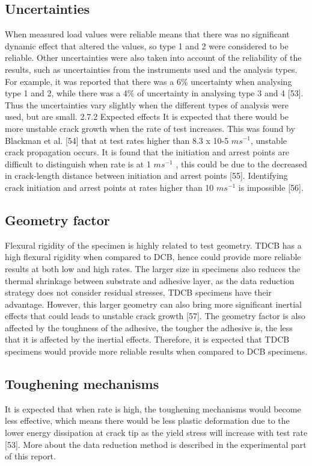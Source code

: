 \documentclass[numbers=noendperiod,chapterprefix=on]{icldt} %
\begin{document}
\subsection{Uncertainties}
When measured load values were reliable means that there was no significant dynamic effect that altered the values, so type 1 and 2 were considered to be reliable.
Other uncertainties were also taken into account of the reliability of the results, such as uncertainties from the instruments used and the analysis types. For example, it was reported that there was a 6\% uncertainty when analysing type 1 and 2, while there was a 4\% of uncertainty in analysing type 3 and 4 [53]. Thus the uncertainties vary slightly when the different types of analysis were used, but are small.
2.7.2 Expected effects
It is expected that there would be more unstable crack growth when the rate of test increases. This was found by Blackman et al. [54] that at test rates higher than 8.3 x 10-5 $ms^{-1}$, unstable crack propagation occurs.
It is found that the initiation and arrest points are difficult to distinguish when rate is at 1 $ms^{-1}$ , this could be due to the decreased in crack-length distance between initiation and arrest points [55]. Identifying crack initiation and arrest points at rates higher than 10 $ms^{-1}$ is impossible [56].

\subsection{Geometry factor}
Flexural rigidity of the specimen is highly related to test geometry. TDCB has a high flexural rigidity when compared to DCB, hence could provide more reliable results at both low and high rates. The larger size in specimens also reduces the thermal shrinkage between substrate and adhesive layer, as the data reduction strategy does not consider residual stresses, TDCB specimens have their advantage. However, this larger geometry can also bring more significant inertial effects that could leads to unstable crack growth [57]. The geometry factor is also affected by the toughness of the adhesive, the tougher the adhesive is, the less that it is affected by the inertial effects. Therefore, it is expected that TDCB specimens would provide more reliable results when compared to DCB specimens.

\subsection{Toughening mechanisms}
It is expected that when rate is high, the toughening mechanisms would become less effective, which means there would be less plastic deformation due to the lower energy dissipation at crack tip as the yield stress will increase with test rate [53].
More about the data reduction method is described in the experimental part of this report.
\end{document}
